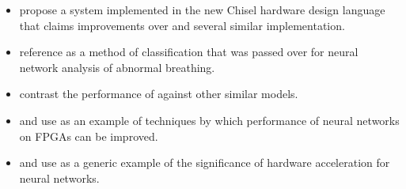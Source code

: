 \documentclass[12pt,letterpaper,english]{article}
\newcommand{\citework}[1]{\citeauthor{#1} \autocite{#1}}
\newcommand{\citeworks}[2]{%
	\citeauthor*{#1} \autocite{#1} and \citeauthor*{#2} \autocite{#2}
}
\begin{document}
\begin{itemize}
	\item \citework{madineni2023parameterizable} propose a system implemented in
	the new Chisel hardware design language that claims improvements over
	 and several similar implementation.
	\item \citework{baedorf2023reverse} reference  as a method
	of classification that was passed over for neural network analysis of
	abnormal breathing.
	\item \citework{phipps2023pre} contrast the performance of 
	against other similar models.
	\item \citeworks{pistellato2023quantization}{yan2023end} use
	 as an example of techniques by which performance of neural
	networks on FPGAs can be improved.
	\item \citeworks{aydin2023fpga}{naufal2023comparative} use 
	as a generic example of the significance of hardware acceleration for neural
	networks.
\end{itemize}


\newpage
\printbibliography
\end{document}
